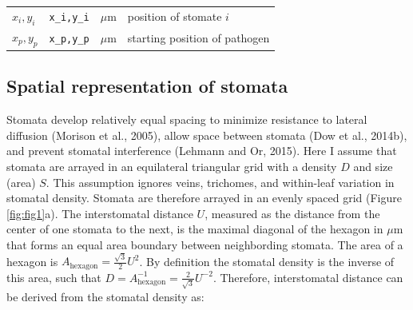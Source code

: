 \documentclass[utf8]{frontiersSCNS}
\begin{document}
\begin{longtable}[]{@{}llll@{}}
\begin{minipage}[t]{0.09\columnwidth}\raggedright
\(x_i,y_i\)\strut
\end{minipage} & \begin{minipage}[t]{0.09\columnwidth}\raggedright
\texttt{x\_i,y\_i}\strut
\end{minipage} & \begin{minipage}[t]{0.09\columnwidth}\raggedright
\(\mu\textrm{m}\)\strut
\end{minipage} & \begin{minipage}[t]{0.61\columnwidth}\raggedright
position of stomate \(i\)\strut
\end{minipage}\tabularnewline
\begin{minipage}[t]{0.09\columnwidth}\raggedright
\(x_p,y_p\)\strut
\end{minipage} & \begin{minipage}[t]{0.09\columnwidth}\raggedright
\texttt{x\_p,y\_p}\strut
\end{minipage} & \begin{minipage}[t]{0.09\columnwidth}\raggedright
\(\mu\textrm{m}\)\strut
\end{minipage} & \begin{minipage}[t]{0.61\columnwidth}\raggedright
starting position of pathogen\strut
\end{minipage}\tabularnewline
\bottomrule
\end{longtable}

\hypertarget{spatial-representation-of-stomata}{%
\subsection*{Spatial representation of
stomata}\label{spatial-representation-of-stomata}}

Stomata develop relatively equal spacing to minimize resistance to
lateral diffusion (Morison et al., 2005), allow space between stomata
(Dow et al., 2014b), and prevent stomatal interference (Lehmann and Or,
2015). Here I assume that stomata are arrayed in an equilateral
triangular grid with a density \(D\) and size (area) \(S\). This
assumption ignores veins, trichomes, and within-leaf variation in
stomatal density. Stomata are therefore arrayed in an evenly spaced grid
(Figure \ref{fig:fig1}a). The interstomatal distance \(U\), measured as
the distance from the center of one stomata to the next, is the maximal
diagonal of the hexagon in \(\mu\textrm{m}\) that forms an equal area
boundary between neighbording stomata. The area of a hexagon is
\(A_\textrm{hexagon} = \frac{\sqrt{3}}{2} U ^ 2\). By definition the
stomatal density is the inverse of this area, such that
\(D = A^{-1}_\textrm{hexagon} = \frac{2}{\sqrt{3}} U ^ {-2}\).
Therefore, interstomatal distance can be derived from the stomatal
density as:
\end{document}
